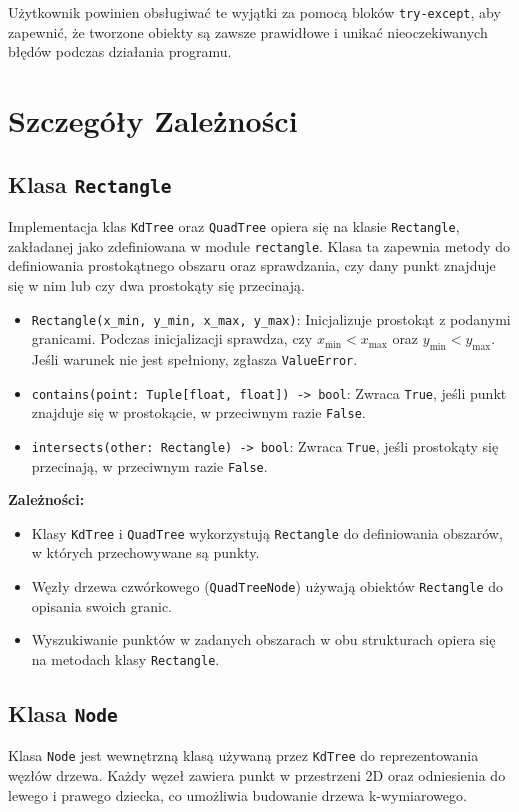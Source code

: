 \documentclass[12pt]{article}
\begin{document}
\noindent Użytkownik powinien obsługiwać te wyjątki za pomocą bloków \texttt{try-except}, aby zapewnić, że tworzone obiekty są zawsze prawidłowe i unikać nieoczekiwanych błędów podczas działania programu.


\section{Szczegóły Zależności}

\subsection{Klasa \texttt{Rectangle}}
Implementacja klas \texttt{KdTree} oraz \texttt{QuadTree} opiera się na klasie \texttt{Rectangle}, zakładanej jako zdefiniowana w module \texttt{rectangle}. Klasa ta zapewnia metody do definiowania prostokątnego obszaru oraz sprawdzania, czy dany punkt znajduje się w nim lub czy dwa prostokąty się przecinają.

\begin{itemize}
    \item \texttt{Rectangle(x\_min, y\_min, x\_max, y\_max)}: 
    Inicjalizuje prostokąt z podanymi granicami. Podczas inicjalizacji sprawdza, czy \( x_{\text{min}} < x_{\text{max}} \) oraz \( y_{\text{min}} < y_{\text{max}} \). Jeśli warunek nie jest spełniony, zgłasza \texttt{ValueError}.
    \item \texttt{contains(point: Tuple[float, float]) -> bool}: 
    Zwraca \texttt{True}, jeśli punkt znajduje się w prostokącie, w przeciwnym razie \texttt{False}.
    \item \texttt{intersects(other: Rectangle) -> bool}: 
    Zwraca \texttt{True}, jeśli prostokąty się przecinają, w przeciwnym razie \texttt{False}.
\end{itemize}

\textbf{Zależności:}
\begin{itemize}
    \item Klasy \texttt{KdTree} i \texttt{QuadTree} wykorzystują \texttt{Rectangle} do definiowania obszarów, w których przechowywane są punkty.
    \item Węzły drzewa czwórkowego (\texttt{QuadTreeNode}) używają obiektów \texttt{Rectangle} do opisania swoich granic.
    \item Wyszukiwanie punktów w zadanych obszarach w obu strukturach opiera się na metodach klasy \texttt{Rectangle}.
\end{itemize}

\subsection{Klasa \texttt{Node}}
Klasa \texttt{Node} jest wewnętrzną klasą używaną przez \texttt{KdTree} do reprezentowania węzłów drzewa. Każdy węzeł zawiera punkt w przestrzeni 2D oraz odniesienia do lewego i prawego dziecka, co umożliwia budowanie drzewa k-wymiarowego.
\end{document}
